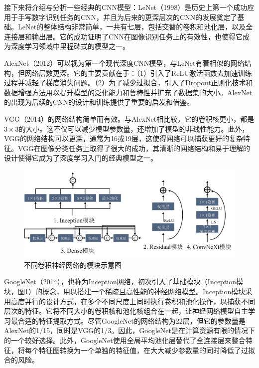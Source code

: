 接下来将介绍与分析一些经典的CNN模型：LeNet\cite{lecun1998gradient}（1998）是历史上第一个成功应用于手写数字识别任务的CNN，并且为后来的更深层次的CNN的发展奠定了基础。LeNet的整体结构非常简单，一共有七层，包括交替的卷积和池化层，以及全连接层和输出层。它的成功证明了CNN在图像识别任务上的有效性，也使得它成为深度学习领域中里程碑式的模型之一。

AlexNet\cite{krizhevsky2012imagenet}（2012）可以视为第一个现代深度CNN模型，与LeNet有着相似的网络结构，但网络层数更深。它的主要贡献在于：（1）引入了ReLU激活函数去加速训练过程并减轻了梯度消失问题。（2）为了减少过拟合，引入了Dropout\cite{srivastava2014dropout}正则化技术和数据增强方法用以提升模型的泛化能力和鲁棒性并扩充了数据集的大小。AlexNet的出现为后续的CNN的设计和训练提供了重要的启发和借鉴。

VGG\cite{Simonyan2014VeryDC}（2014）的网络结构简单而有效。与AlexNet相比较，它的卷积核更小，都是\(3\times3\)的大小。这不仅可以减少模型参数量，还增加了模型的非线性能力。此外，VGG的网络结构可以更深，通常为16或19层，这使得网络可以捕获更好的复杂特征。VGG在图像分类任务上取得了很大的成功，其清晰的网络结构和易于理解的设计使得它成为了深度学习入门的经典模型之一。

\begin{figure}[ht]
  \centering
  \includegraphics[width=\textwidth]{figures/chap02_block.jpg}
  \caption{不同卷积神经网络的模块示意图}
  \label{fig:chap02_block}
\end{figure}

GoogleNet\cite{szegedy2015going}（2014），也称为Inception网络，初次引入了基础模块（Inception模块，图\ref{fig:chap02_block}）的概念，用以搭建一个稀疏且高性能的神经网络模型。Inception模块采用高度并行的设计方式，在多个不同尺度上同时执行卷积和池化操作，以捕获不同层次的特征。它将不同大小的卷积核和池化核组合在一起，让神经网络模型自主学习最合适的特征提取方式。尽管GoogleNet的网络结构为22层，但它的参数量是AlexNet的1/15，同时是VGG的1/3。因此，GoogleNet是在计算资源有限的情况下的一个较好选择。此外，GoogleNet使用全局平均池化层替代了全连接层来整合特征，将每个特征图转换为一个单独的特征值，在大大减少参数量的同时降低了过拟合的风险。

